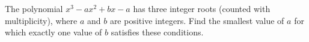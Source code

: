The polynomial $x^3-ax^2+bx-a$ has three integer roots (counted with multiplicity), where $a$ and $b$ are positive integers. Find the smallest value of $a$ for which exactly one value of $b$ satisfies these conditions.
